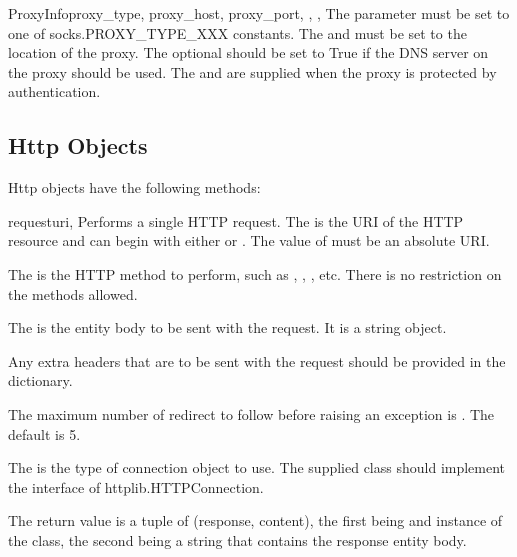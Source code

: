 \begin{classdesc}{ProxyInfo}{proxy_type, proxy_host, proxy_port, , , }
The parameter  must be set to one of socks.PROXY_TYPE_XXX
constants. The  and  must be set to the location
of the proxy. The optional  should be set to True if
the DNS server on the proxy should be used. The  and 
 are supplied when the proxy is protected by authentication.
\end{classdesc}



\subsection{Http Objects}
\label{http-objects}

Http objects have the following methods:

\begin{methoddesc}[Http]{request}{uri, }
Performs a single HTTP request.
The  is the URI of the HTTP resource and can begin with either  or . The value of  must be an absolute URI.

The  is the HTTP method to perform, such as , , , etc. There is no restriction
on the methods allowed.

The  is the entity body to be sent with the request. It is a string
object.

Any extra headers that are to be sent with the request should be provided in the
 dictionary.

The maximum number of redirect to follow before raising an exception is . The default is 5.

The  is the type of connection object to use. The supplied class
should implement the interface of httplib.HTTPConnection.

The return value is a tuple of (response, content), the first being and instance of the
 class, the second being a string that contains the response entity body.
\end{methoddesc}

